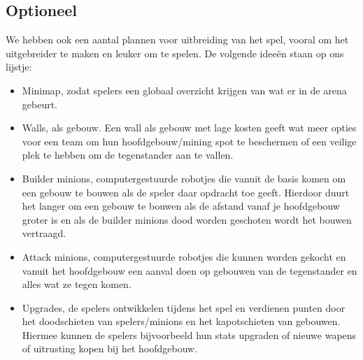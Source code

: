 \subsection{Optioneel}
We hebben ook een aantal plannen voor uitbreiding van het spel, vooral om het uitgebreider te maken en leuker om te spelen. De volgende idee\"en staan op ons lijstje:
\begin{itemize}
  \item Minimap, zodat spelers een globaal overzicht krijgen van wat er in de arena gebeurt.
  \item Walls, als gebouw. Een wall als gebouw met lage kosten geeft wat meer opties voor een team om hun hoofdgebouw/mining spot te beschermen of een veilige plek te hebben om de tegenstander aan te vallen.
  \item Builder minions, computergestuurde robotjes die vanuit de basis komen om een gebouw te bouwen als de speler daar opdracht toe geeft. Hierdoor
duurt het langer om een gebouw te bouwen als de afstand vanaf je hoofdgebouw groter is en als de builder minions dood worden geschoten wordt het bouwen vertraagd.
  \item Attack minions, computergestuurde robotjes die kunnen worden gekocht en vanuit het hoofdgebouw een aanval doen op gebouwen van de tegenstander en alles wat ze tegen komen.
  \item Upgrades, de spelers ontwikkelen tijdens het spel en verdienen punten door het doodschieten van spelers/minions en het kapotschieten van gebouwen. Hiermee kunnen de spelers bijvoorbeeld hun stats upgraden of nieuwe wapens of uitrusting kopen bij het hoofdgebouw.
\end{itemize}
